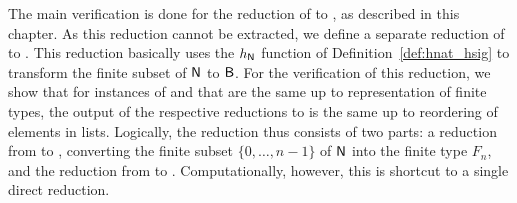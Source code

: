 The main verification is done for the reduction of \PR{} to \BPR{}, as described in this chapter. As this reduction cannot be extracted, we define a separate reduction of \FlatPR{} to \BPR{}. This reduction basically uses the $h_{\mathsf{N}}$ function of Definition~\ref{def:hnat_hsig} to transform the finite subset of $\mathsf{N}$ to $\textsf{B}$. 
For the verification of this reduction, we show that for instances of \FlatPR{} and \PR{} that are the same up to representation of finite types, the output of the respective reductions to \BPR{} is the same up to reordering of elements in lists. Logically, the reduction thus consists of two parts: a reduction from \FlatPR{} to \PR{}, converting the finite subset $\{0, \ldots, n-1\}$ of $\mathsf{N}$ into the finite type $F_n$, and the reduction from \PR{} to \BPR{}. Computationally, however, this is shortcut to a single direct reduction.
